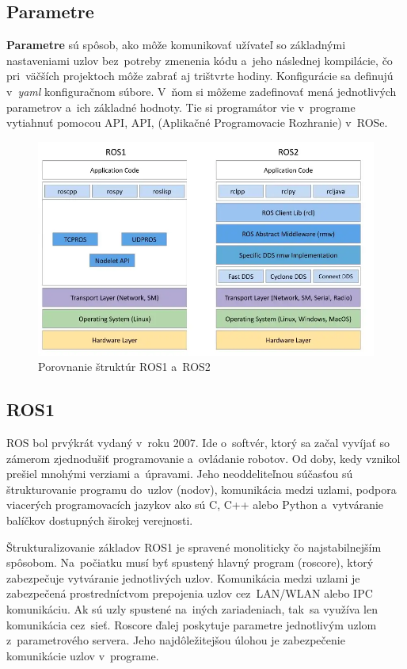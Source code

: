 \subsection{Parametre}
\label{sec:parametre}

\textbf{Parametre} sú spôsob, ako môže komunikovať užívateľ so základnými nastaveniami uzlov bez~potreby zmenenia kódu a~jeho
následnej kompilácie, čo pri~väčších projektoch môže zabrať aj trištvrte hodiny. Konfigurácie sa definujú v~\textit{yaml} konfiguračnom
súbore. V~ňom si môžeme zadefinovať mená jednotlivých parametrov a~ich základné hodnoty. Tie si programátor vie v~programe
vytiahnuť pomocou API, \acrlong{API}, (Aplikačné Programovacie Rozhranie) v~ROSe.

\begin{figure}[!htbp]
	\centering
	\includegraphics[width=15cm]{img/strukturaRos1Ros2.png}
	\caption{Porovnanie štruktúr ROS1 a~ROS2~\cite{comparison}}
	\label{fig:struktury}
\end{figure}

\subsection{ROS1}

ROS bol prvýkrát vydaný v~roku 2007. Ide o~softvér, ktorý sa začal vyvíjať so zámerom zjednodušiť programovanie a~ovládanie robotov.
Od doby, kedy vznikol prešiel mnohými verziami a~úpravami. Jeho neoddeliteľnou súčasťou sú štrukturovanie programu do~uzlov (nodov),
komunikácia medzi uzlami, podpora viacerých programovacích jazykov ako sú C, C++ alebo Python a~vytváranie balíčkov dostupných širokej
verejnosti.

Štrukturalizovanie základov ROS1 je spravené monoliticky čo najstabilnejším spôsobom. Na~počiatku musí byť spustený hlavný program (roscore),
ktorý zabezpečuje vytváranie jednotlivých uzlov. Komunikácia medzi uzlami je zabezpečená prostredníctvom prepojenia uzlov cez~LAN/WLAN
alebo IPC komunikáciu. Ak sú uzly spustené na~iných zariadeniach, tak~sa využíva len komunikácia cez~sieť. Roscore ďalej poskytuje parametre
jednotlivým uzlom z~parametrového servera. Jeho najdôležitejšou úlohou je zabezpečenie komunikácie uzlov v~programe.

